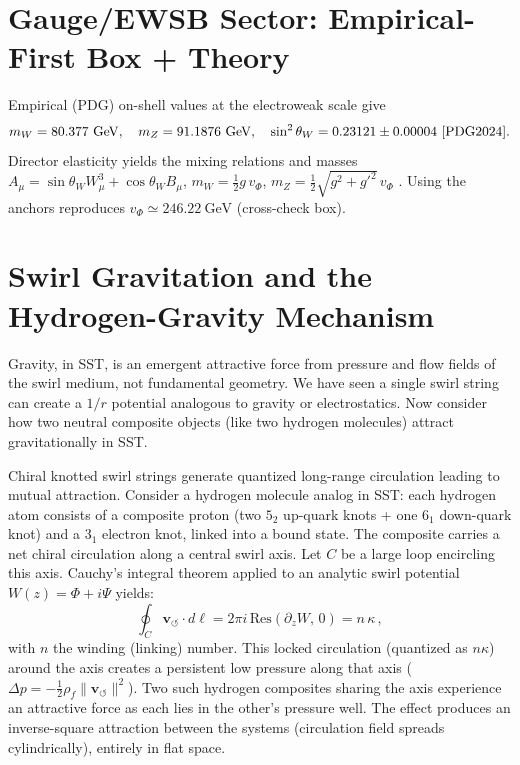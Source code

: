 \documentclass[10pt,reprint,aps,onecolumn,nofootinbib]{revtex4-2}
\newcommand{\vswirl}{\mathbf{v}_{\!\boldsymbol{\circlearrowleft}}}
\begin{document}
    \section{Gauge/EWSB Sector: Empirical-First Box + Theory}\label{canon58:gauge-openers}
    Empirical (PDG) on-shell values at the electroweak scale give
    \[
        m_W=80.377~\mathrm{GeV},\quad m_Z=91.1876~\mathrm{GeV},\quad \sin^2\theta_W=0.23121\pm0.00004 \ \cite{PDG2024}.
    \]
    Director elasticity yields the mixing relations and masses
    $A_\mu=\sin\theta_W W^3_\mu+\cos\theta_W B_\mu$,
    $m_W=\tfrac12 g\,v_\Phi$, $m_Z=\tfrac12\sqrt{g^2+g'^2}\,v_\Phi$ \cite{Weinberg1967,PeskinSchroeder1995}.
    Using the anchors reproduces $v_\Phi\simeq 246.22~\mathrm{GeV}$ (cross-check box). %



    \section{Swirl Gravitation and the Hydrogen-Gravity Mechanism}
        Gravity, in SST, is an emergent attractive force from pressure and flow fields of the swirl medium, not fundamental geometry. We have seen a single swirl string can create a $1/r$ potential analogous to gravity or electrostatics. Now consider how two neutral composite objects (like two hydrogen molecules) attract gravitationally in SST.

        \begin{tcolorbox}[title=Theorem 7.1: Hydrogen-Gravity Mechanism (Swirl Attraction in Flat Space)]
        Chiral knotted swirl strings generate quantized long-range circulation leading to mutual attraction. Consider a hydrogen molecule analog in SST: each hydrogen atom consists of a composite proton (two $5_2$ up-quark knots + one $6_1$ down-quark knot) and a $3_1$ electron knot, linked into a bound state. The composite carries a net chiral circulation along a central swirl axis. Let $C$ be a large loop encircling this axis. Cauchy’s integral theorem applied to an analytic swirl potential $W(z) = \Phi + i\Psi$ yields:
        \[
            \oint_C \vswirl \cdot d\ell = 2\pi i \,\text{Res}(\partial_z W,\,0) = n\,\kappa\,,
        \]
        with $n$ the winding (linking) number. This locked circulation (quantized as $n\kappa$) around the axis creates a persistent low pressure along that axis ($\Delta p = -\frac{1}{2}\rho_f \|\vswirl\|^2$). Two such hydrogen composites sharing the axis experience an attractive force as each lies in the other’s pressure well. The effect produces an inverse-square attraction between the systems (circulation field spreads cylindrically), entirely in flat space.
        \end{tcolorbox}
\end{document}
